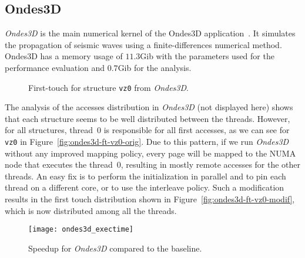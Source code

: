\subsection{Ondes3D}
\label{sec:exp-ondes3d}

\emph{Ondes3D} is the main numerical kernel of the Ondes3D
application~\cite{Dupros2008}. It simulates the propagation of seismic waves
using a finite-differences numerical method. Ondes3D has a memory usage of
$11.3$Gib with the parameters used for the performance evaluation and $0.7$Gib
for the analysis.

\begin{figure}[htb]
    \centering

    \caption{First-touch for structure
        \texttt{vz0} from \emph{Ondes3D}.} %
    \label{fig:ondes3d}
\end{figure}

The analysis of the accesses distribution in \emph{Ondes3D} (not displayed
here) shows that each
structure seems to be well distributed between the threads. %
However, for all structures,
thread~$0$ is responsible for all first accesses, as we can see for \texttt{vz0} in
Figure~\ref{fig:ondes3d-ft-vz0-orig}. Due to
this pattern, if we run \emph{Ondes3D} without any improved mapping policy, every page will be
mapped to the NUMA node that executes the thread~$0$, resulting in mostly remote
accesses for the other threads. An easy fix is to perform the initialization
in parallel and to pin each thread on a different core, or to use the
interleave policy.
Such a modification results in the first touch distribution shown in
Figure~\ref{fig:ondes3d-ft-vz0-modif}, which is now distributed among all the threads.

\begin{figure}[htb]
    \centering
    \texttt{[image: ondes3d\_exectime]}
    \caption{Speedup for \emph{Ondes3D} compared to the baseline.}
    \label{fig:ondes-res}
\end{figure}

